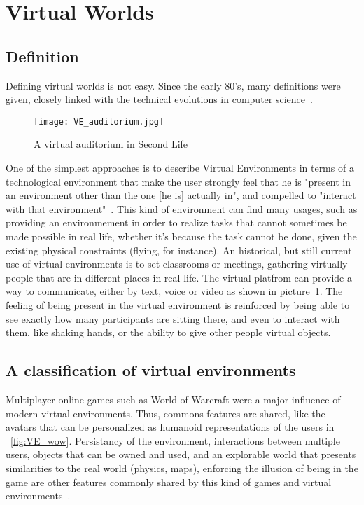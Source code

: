\section{Virtual Worlds}

\subsection{Definition}
Defining virtual worlds is not easy. Since the early 80's, many definitions were given, closely linked with the technical evolutions in computer science~\cite{warburton2009second}. %

\begin{figure}[h]
  \caption{A virtual auditorium in Second Life ~\cite{ref_VE_audit}}
  \centering
  \texttt{[image: VE\_auditorium.jpg]}
  \label{fig:VE_audit}
\end{figure}


One of the simplest approaches is to describe Virtual Environments in terms of a technological environment that make the user strongly feel that he is "present in an environment other than the one [he is] actually in", and compelled to "interact with that environment"~\cite{schroeder1996possible}. This kind of environment can find many usages, such as providing an environmement in order to realize tasks that cannot sometimes be made possible in real life, whether it's because the task cannot be done, given the existing physical constraints (flying, for instance). An historical, but still current use of virtual environments is to set classrooms or meetings, gathering virtually people that are in different places in real life. The virtual platfrom can provide a way to communicate, either by text, voice or video as shown in picture~\ref{fig:VE_audit}. The feeling of being present in the virtual environment is reinforced by being able to see exactly how many participants are sitting there, and even to interact with them, like shaking hands, or the ability to give other people virtual objects.



\subsection{A classification of virtual environments}
Multiplayer online games such as World of Warcraft were a major influence of modern virtual environments. Thus, commons features are shared, like the avatars that can be personalized as humanoid representations of the users in ~\ref{fig:VE_wow}.
Persistancy of the environment, interactions between multiple users, objects that can be owned and used, and an explorable world that presents similarities to the real world (physics, maps), enforcing the illusion of being in the game are other features commonly shared by this kind of games and virtual environments~\cite{warburton2009second}. 

